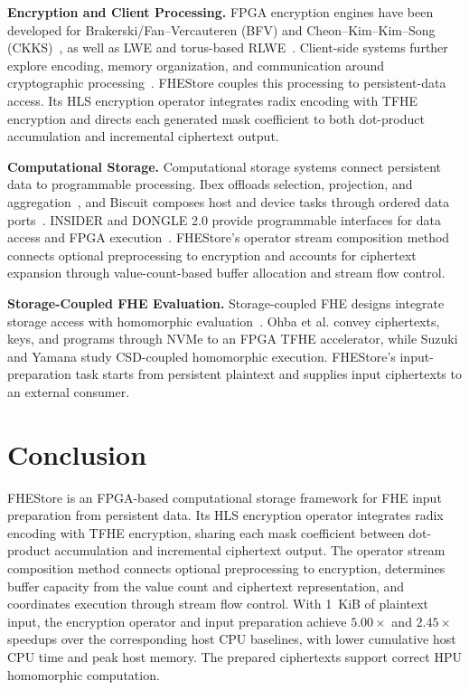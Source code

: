\documentclass[sigconf,anonymous,balance=false]{acmart}
\newcommand{\bodypar}{\par\vskip 0pt plus 6pt\relax}
\begin{document}
\noindent\textbf{Encryption and Client Processing.}
FPGA encryption engines have been developed for Brakerski/Fan--Vercauteren (BFV) and Cheon--Kim--Kim--Song (CKKS)~\cite{mert2020bfv,lee2023ckks}, as well as LWE and torus-based RLWE~\cite{feryputri2025lwe,syafalni2026multicore}. Client-side systems further explore encoding, memory organization, and communication around cryptographic processing~\cite{krieger2024aloha,yune2025abcfhe,vanderhagen2022choco,gupta2024memfhe}. FHEStore couples this processing to persistent-data access. Its HLS encryption operator integrates radix encoding with TFHE encryption and directs each generated mask coefficient to both dot-product accumulation and incremental ciphertext output.
\bodypar

\noindent\textbf{Computational Storage.}
Computational storage systems connect persistent data to programmable processing. Ibex offloads selection, projection, and aggregation~\cite{woods2014ibex}, and Biscuit composes host and device tasks through ordered data ports~\cite{gu2016biscuit}. INSIDER and DONGLE 2.0 provide programmable interfaces for data access and FPGA execution~\cite{ruan2019insider,wong2024dongle}. FHEStore's operator stream composition method connects optional preprocessing to encryption and accounts for ciphertext expansion through value-count-based buffer allocation and stream flow control.
\bodypar

\noindent\textbf{Storage-Coupled FHE Evaluation.}
Storage-coupled FHE designs integrate storage access with homomorphic evaluation~\cite{ohba2025nvme,suzuki2023isc}. Ohba et al. convey ciphertexts, keys, and programs through NVMe to an FPGA TFHE accelerator, while Suzuki and Yamana study CSD-coupled homomorphic execution. FHEStore's input-preparation task starts from persistent plaintext and supplies input ciphertexts to an external consumer.

\section{Conclusion}
\label{sec:conclusion}
FHEStore is an FPGA-based computational storage framework for FHE input preparation from persistent data. Its HLS encryption operator integrates radix encoding with TFHE encryption, sharing each mask coefficient between dot-product accumulation and incremental ciphertext output. The operator stream composition method connects optional preprocessing to encryption, determines buffer capacity from the value count and ciphertext representation, and coordinates execution through stream flow control. With 1~KiB of plaintext input, the encryption operator and input preparation achieve $5.00\times$ and $2.45\times$ speedups over the corresponding host CPU baselines, with lower cumulative host CPU time and peak host memory. The prepared ciphertexts support correct HPU homomorphic computation.




\end{document}
